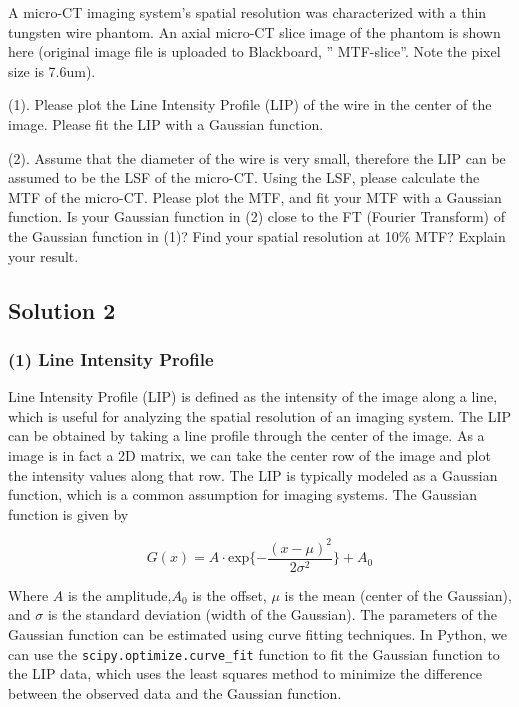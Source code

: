 \documentclass[12pt, a4paper, oneside]{ctexart}
\begin{document}
\begin{problem}

A micro-CT imaging system’s spatial resolution was characterized with a thin tungsten wire phantom. An axial micro-CT slice image of the phantom is shown here (original image file is uploaded to Blackboard, ” MTF-slice”. Note the pixel size is 7.6um).

(1). Please plot the Line Intensity Profile (LIP) of the wire in the center of the image. Please fit the LIP with a Gaussian function.

(2). Assume that the diameter of the wire is very small, therefore the LIP can be assumed to be the LSF of the micro-CT. Using the LSF, please calculate the MTF of the micro-CT.  Please plot the MTF, and fit your MTF with a Gaussian function.  Is your Gaussian function in (2) close to the FT (Fourier Transform) of the Gaussian function in (1)? Find your spatial resolution at 10\% MTF? Explain your result.


\end{problem}
\subsection*{Solution 2}

\subsubsection*{(1) Line Intensity Profile}

Line Intensity Profile (LIP) is defined as the intensity of the image along a line, which is useful for analyzing the spatial resolution of an imaging system. The LIP can be obtained by taking a line profile through the center of the image. As a image is in fact a 2D matrix, we can take the center row of the image and plot the intensity values along that row. The LIP is typically modeled as a Gaussian function, which is a common assumption for imaging systems. The Gaussian function is given by

\[G(x) = A \cdot \text{exp}\{-\frac{(x - \mu)^2}{2\sigma^2}\}+A_0\]

Where \(A\) is the amplitude,\(A_0\) is the offset, \(\mu\) is the mean (center of the Gaussian), and \(\sigma\) is the standard deviation (width of the Gaussian). The parameters of the Gaussian function can be estimated using curve fitting techniques. In Python, we can use the \texttt{scipy.optimize.curve\_fit} function to fit the Gaussian function to the LIP data, which uses the least squares method to minimize the difference between the observed data and the Gaussian function.
\end{document}
